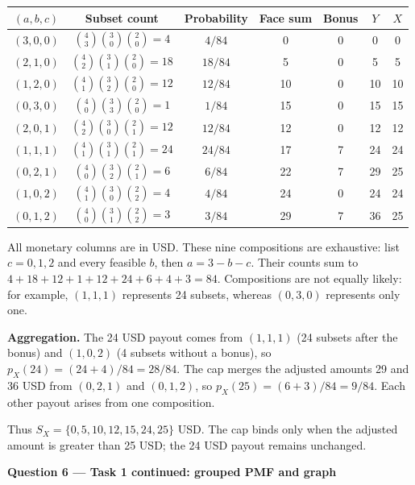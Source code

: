 \begin{center}
\begin{tabular}{ccccccc}\toprule
$(a,b,c)$ & Subset count & Probability & Face sum & Bonus & $Y$ & $X$\\\midrule
$(3,0,0)$ & $\binom4{3}\binom3{0}\binom2{0}=4$ & $4/84$ & 0 & 0 & 0 & 0\\
$(2,1,0)$ & $\binom4{2}\binom3{1}\binom2{0}=18$ & $18/84$ & 5 & 0 & 5 & 5\\
$(1,2,0)$ & $\binom4{1}\binom3{2}\binom2{0}=12$ & $12/84$ & 10 & 0 & 10 & 10\\
$(0,3,0)$ & $\binom4{0}\binom3{3}\binom2{0}=1$ & $1/84$ & 15 & 0 & 15 & 15\\
$(2,0,1)$ & $\binom4{2}\binom3{0}\binom2{1}=12$ & $12/84$ & 12 & 0 & 12 & 12\\
$(1,1,1)$ & $\binom4{1}\binom3{1}\binom2{1}=24$ & $24/84$ & 17 & 7 & 24 & 24\\
$(0,2,1)$ & $\binom4{0}\binom3{2}\binom2{1}=6$ & $6/84$ & 22 & 7 & 29 & 25\\
$(1,0,2)$ & $\binom4{1}\binom3{0}\binom2{2}=4$ & $4/84$ & 24 & 0 & 24 & 24\\
$(0,1,2)$ & $\binom4{0}\binom3{1}\binom2{2}=3$ & $3/84$ & 29 & 7 & 36 & 25\\
\bottomrule\end{tabular}
\end{center}

\endgroup

All monetary columns are in USD. These nine compositions are exhaustive: list $c=0,1,2$ and every feasible $b$, then $a=3-b-c$. Their counts sum to $4+18+12+1+12+24+6+4+3=84$. Compositions are not equally likely: for example, $(1,1,1)$ represents 24 subsets, whereas $(0,3,0)$ represents only one.

\textbf{Aggregation.} The 24 USD payout comes from $(1,1,1)$ (24 subsets after the bonus) and $(1,0,2)$ (4 subsets without a bonus), so $p_X(24)=(24+4)/84=28/84$. The cap merges the adjusted amounts 29 and 36 USD from $(0,2,1)$ and $(0,1,2)$, so $p_X(25)=(6+3)/84=9/84$. Each other payout arises from one composition.

Thus $S_X=\{0,5,10,12,15,24,25\}$ USD. The cap binds only when the adjusted amount is greater than 25 USD; the 24 USD payout remains unchanged.

\par\vspace{3mm}\secInicio[][sec:q6]

\clearpage\textbf{Question 6 --- Task 1 continued: grouped PMF and graph}

